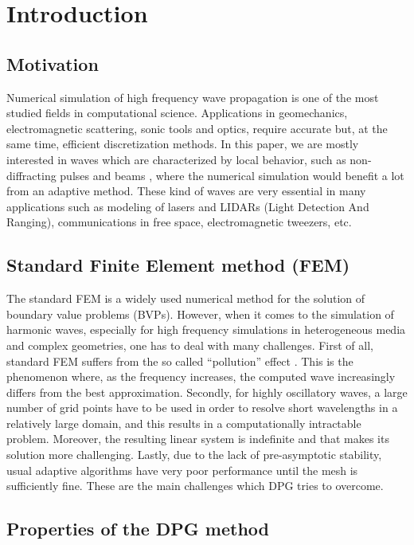 
\section{Introduction}

\subsection{Motivation}
Numerical simulation of high frequency wave propagation is one of the most studied fields in computational science. Applications in geomechanics,  electromagnetic scattering, sonic tools and optics, require accurate but, at the same time, efficient discretization methods. In this paper, we are mostly interested in waves which are characterized by local behavior, such as non-diffracting pulses and beams \cite{nondiffr}, where the numerical simulation would benefit a lot from an adaptive method. These kind of waves are very essential in many applications such as modeling of lasers and LIDARs (Light Detection And Ranging), communications in free space, electromagnetic tweezers, etc. 


\subsection{Standard Finite Element method (FEM)}
The standard FEM is a widely used numerical method for the solution of boundary value problems (BVPs). However, when it comes to the simulation of harmonic waves, especially for high frequency simulations in heterogeneous media and complex geometries, one  has to deal with many challenges. First of all, standard FEM suffers from the so called ``pollution'' effect \cite{Babuska1}. This is the phenomenon where, as the frequency increases, the computed wave increasingly differs from the best approximation. Secondly, for highly oscillatory waves, a large number of grid points have to be used in order to resolve short wavelengths in a relatively large domain, and this results in a computationally intractable problem. Moreover, the resulting linear system is indefinite and that makes its solution more challenging. Lastly, due to the lack of pre-asymptotic stability, usual adaptive algorithms have very poor performance until the mesh is sufficiently fine. These are the main challenges which DPG tries to overcome. 

\subsection{Properties of the DPG method} 

